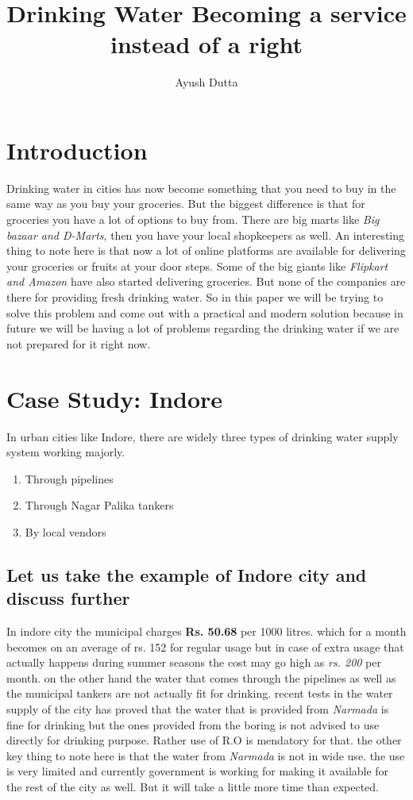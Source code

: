 \documentclass[a4paper, 12pt]{article}
\title{Drinking Water Becoming a service instead of a right}
\author{Ayush Dutta}
\begin{document}
\maketitle

\section{Introduction}
Drinking water in cities has now become something that you need to buy in the same way as you buy your groceries. But the biggest difference is that for groceries you have a lot of options to buy from. There are big marts like
\textit{Big bazaar and D-Marts}, 
then you have your local shopkeepers as well. An interesting thing to note here is that now a lot of online platforms are available for delivering your groceries or fruits at your door steps. Some of the big giants like
\textit{Flipkart and Amazon} 
have also started delivering groceries. But none of the companies are there for providing fresh drinking water. So in this paper we will be trying to solve this problem and come out with a practical and modern solution because in future we will be having a lot of problems regarding the drinking water if we are not prepared for it right now.

\section{Case Study: Indore}
In urban cities like Indore, there are widely three types of drinking water supply system working majorly.
\begin{enumerate}
    \item Through pipelines
    \item Through Nagar Palika tankers
    \item By local vendors
\end{enumerate}

\subsection[short]{Let us take the example of Indore city and discuss further}
In indore city the municipal charges \textbf{Rs. 50.68} per 1000 litres. which for a month becomes on an average of rs. 152 for regular usage but in case of extra usage 
that actually happens during summer seasons the cost may go high as \textit{rs. 200} per month. on the other hand the water that comes through the pipelines as well as 
the municipal tankers are not actually fit for drinking. recent tests in the water supply of the city has proved that the water that is provided from \textit{Narmada} is 
fine for drinking but the ones provided from the boring is not advised to use directly for drinking purpose. Rather use of R.O is mendatory for that. the other key thing 
to note here is that the water from \textit{Narmada} is not in wide use. the use is very limited and currently government is working for making it available for the rest
of the city as well. But it will take a little more time than expected. 
\end{document}
